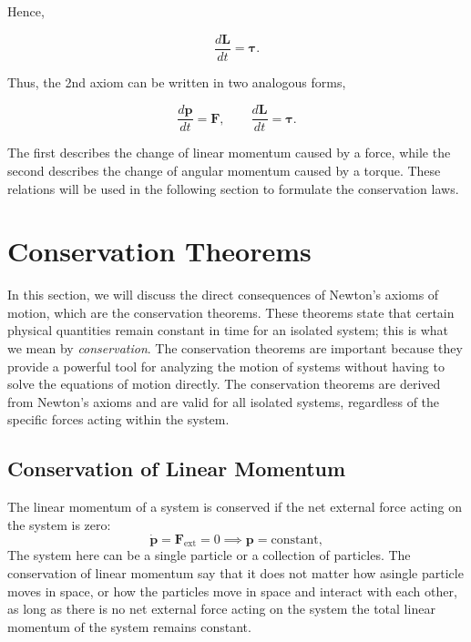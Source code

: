 \documentclass[12pt]{article}
\begin{document}
Hence,

\begin{equation}
\boxed{
\frac{d\mathbf{L}}{dt}
= \boldsymbol{\tau}
}.
\end{equation}

Thus, the 2nd axiom can be written in two analogous forms,

\begin{equation}
\boxed{\frac{d\mathbf{p}}{dt}=\mathbf{F}},
\qquad
\boxed{\frac{d\mathbf{L}}{dt}=\boldsymbol{\tau}}.
\end{equation}

The first describes the change of linear momentum caused by a force,
while the second describes the change of angular momentum caused by a
torque. These relations will be used in the following section to
formulate the conservation laws.


\section{Conservation Theorems}
In this section, we will discuss the direct consequences of Newton's axioms of motion, which are the conservation theorems. These theorems state that certain physical quantities remain constant in time for an isolated system; this is what we mean by \emph{conservation}. The conservation theorems are important because they provide a powerful tool for analyzing the motion of systems without having to solve the equations of motion directly. The conservation theorems are derived from Newton's axioms and are valid for all isolated systems, regardless of the specific forces acting within the system.

\subsection{Conservation of Linear Momentum}
The linear momentum of a system is conserved if the net external force acting on the system is zero:
\begin{equation}
    \dot{\mathbf{p}} = \mathbf{F}_{\text{ext}} = 0 \implies \mathbf{p} = \text{constant},
\end{equation}
The system here can be a single particle or a collection of particles. The conservation of linear momentum say that it does not matter how asingle particle moves in space, or how the particles move in space and interact with each other, as long as there is no net external force acting on the system the total linear momentum of the system remains constant. 
\end{document}
